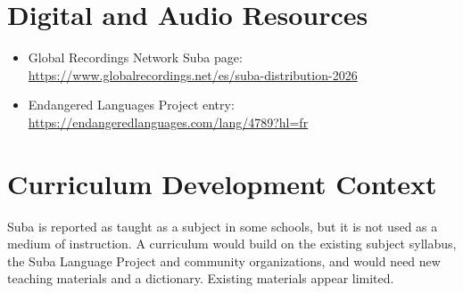 \documentclass[12pt]{article}
\begin{document}
\section{Digital and Audio Resources}
\begin{itemize}
\item Global Recordings Network Suba page: \url{https://www.globalrecordings.net/es/suba-distribution-2026}
\item Endangered Languages Project entry: \url{https://endangeredlanguages.com/lang/4789?hl=fr}
\end{itemize}

\section{Curriculum Development Context}
Suba is reported as taught as a subject in some schools, but it is not used as a medium of instruction. A curriculum would build on the existing subject syllabus, the Suba Language Project and community organizations, and would need new teaching materials and a dictionary. Existing materials appear limited.
\end{document}

